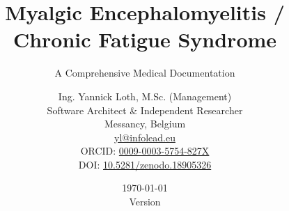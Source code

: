 \documentclass[11pt,oneside,a4paper,numbers=noenddot,headheight=27.2pt]{scrbook}
\newcommand{\MECFSPaperDOI}{10.5281/zenodo.18905326}
\newcommand{\MECFSPaperDoiUrl}{https://doi.org/\MECFSPaperDOI{}}
\newcommand{\MECFSPaperDoiHref}{\href{\MECFSPaperDoiUrl{}}{\MECFSPaperDOI{}}}
\begin{document}
\title{Myalgic Encephalomyelitis / Chronic Fatigue Syndrome}
\subtitle{A Comprehensive Medical Documentation}
\author{Ing. Yannick Loth, M.Sc. (Management)\\
    \small Software Architect \& Independent Researcher\\
    \small Messancy, Belgium\\
    \small \href{mailto:yl@infolead.eu}{yl@infolead.eu}\\
    \small ORCID: \href{https://orcid.org/0009-0003-5754-827X}{0009-0003-5754-827X}\\
    \small DOI: \MECFSPaperDoiHref{}}
\date{\today \\Version \docversion{}}
\maketitle

\frontmatter











\tableofcontents
\listoffigures
\listoftables

\mainmatter







\end{document}
